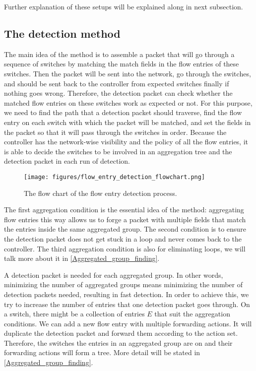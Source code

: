 Further explanation of these setups will be explained along in next subsection.

\subsection{The detection method}
\label{Detection_method}

The main idea of the method is to assemble a packet that will go through a sequence of switches by matching the match fields in the flow entries of these switches. Then the packet will be sent into the network, go through the switches, and should be sent back to the controller from expected switches finally if nothing goes wrong. Therefore, the detection packet can check whether the matched flow entries on these switches work as expected or not. For this purpose, we need to find the path that a detection packet should traverse, find the flow entry on each switch with which the packet will be matched, and set the fields in the packet so that it will pass through the switches in order. Because the controller has the network-wise visibility and the policy of all the flow entries, it is able to decide the switches to be involved in an aggregation tree and the detection packet in each run of detection. 

\begin{figure}[H]
\begin{center} 
\texttt{[image: figures/flow\_entry\_detection\_flowchart.png]}
\end{center}
\caption{The flow chart of the flow entry detection process.}
\label{flow_entry_detection_flowchart}
\end{figure}

The first aggregation condition is the essential idea of the method: aggregating flow entries this way allows us to forge a packet with multiple fields that match the entries inside the same aggregated group. The second condition is to ensure the detection packet does not get stuck in a loop and never comes back to the controller. The third aggregation condition is also for eliminating loops, we will talk more about it in \ref{Aggregated_group_finding}.

A detection packet is needed for each aggregated group. In other words, minimizing the number of aggregated groups means minimizing the number of detection packets needed, resulting in fast detection. In order to achieve this, we try to increase the number of entries that one detection packet goes through. On a switch, there might be a collection of entries $E$ that suit the aggregation conditions. We can add a new flow entry with multiple forwarding actions. It will duplicate the detection packet and forward them according to the action set. Therefore, the switches the entries in an aggregated group are on and their forwarding actions will form a tree. More detail will be stated in \ref{Aggregated_group_finding}.

